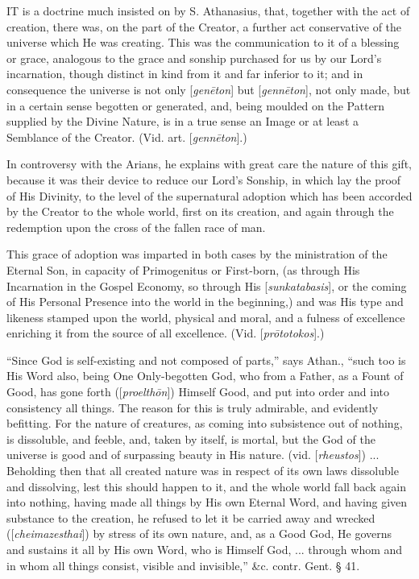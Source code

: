 
IT
is a doctrine much insisted on by S. Athanasius, that, together with
the act of creation, there was, on the part of the Creator, a further
act conservative of the universe which He was creating. This was the
communication to it of a blessing or grace, analogous to the grace and
sonship purchased for us by our Lord's incarnation, though distinct in
kind from it and far inferior to it; and in consequence the universe
is not only [\emph{gen\={e}ton}] but [\emph{genn\={e}ton}], not
only made, but in a certain sense begotten or generated, and, being
moulded on the Pattern supplied by the Divine Nature, is in a true
sense an Image or at least a Semblance of the Creator. (Vid. art. [\emph{genn\={e}ton}].)

In controversy with the Arians, he explains with
great care the nature of this gift, because it was their device to
reduce our Lord's Sonship, in which lay the proof of His Divinity, to
the level of the supernatural adoption which has been accorded by the
Creator to the whole world, first on its creation, and again through
the redemption upon the cross of the fallen race of man.

This grace of adoption was imparted in both cases
by the ministration of the Eternal Son, in capacity of Primogenitus or
First-born, (as through His Incarnation in the Gospel Economy, so
through His [\emph{sunkatabasis}],
or the coming of His Personal Presence into the world in
the beginning,) and was His type and likeness stamped upon the world,
physical and moral, and a fulness of excellence enriching it from the
source of all excellence. (Vid. [\emph{pr\={o}totokos}].)

``Since God is self-existing and not composed of
parts,'' says Athan., ``such too is His Word also, being One
Only-begotten God, who from a Father, as a Fount of Good, has gone
forth ([\emph{proelth\={o}n}]) Himself Good, and put into order and
into consistency all things. The reason for this is truly admirable,
and evidently befitting. For the nature of creatures, as coming into
subsistence out of nothing, is dissoluble, and feeble, and, taken by
itself, is mortal, but the God of the universe is good and of
surpassing beauty in His nature. (vid. [\emph{rheustos}]) ... Beholding then that all created nature was in respect of
its own laws dissoluble and dissolving, lest this should happen to it,
and the whole world fall back again into nothing, having made all
things by His own Eternal Word, and having given substance to the
creation, he refused to let it be carried away and wrecked ([\emph{cheimazesthai}]) by stress of its own nature, and, as a Good God, He governs
and sustains it all by His own Word, who is Himself God, ... through
whom and in whom all things consist, visible and invisible,'' \&c.
contr. Gent. § 41.

